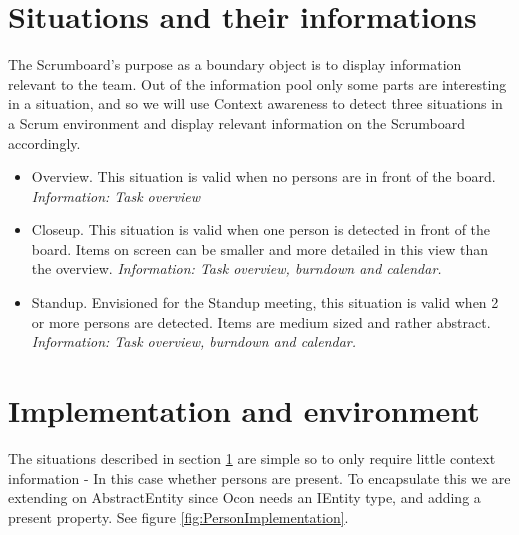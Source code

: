 \documentclass[../report.tex]{subfiles}
\begin{document}








\section{Situations and their informations}
\label{sec:proofSituations}

The Scrumboard's purpose as a boundary object is to display information relevant to the team. Out of the information pool only some parts are interesting in a situation, and so we will use Context awareness to detect three situations in a Scrum environment and display relevant information on the Scrumboard accordingly.


\begin{itemize}
\item Overview. This situation is valid when no persons are in front of the board.
\subitem \textit{Information: Task overview}

\item Closeup. This situation is valid when one person is detected in front of the board. Items on screen can be smaller and more detailed in this view than the overview.
\subitem \textit{Information: Task overview, burndown and calendar.}

\item Standup. Envisioned for the Standup meeting, this situation is valid when 2 or more persons are detected. Items are medium sized and rather abstract.
\subitem \textit{Information: Task overview, burndown and calendar.}
\end{itemize}





\section{Implementation and environment}

The situations described in section \ref{sec:proofSituations} are simple so to only require little context information - In this case whether persons are present. To encapsulate this we are extending on AbstractEntity since Ocon needs an IEntity type, and adding a present property. See figure \ref{fig:PersonImplementation}. 
\end{document}
